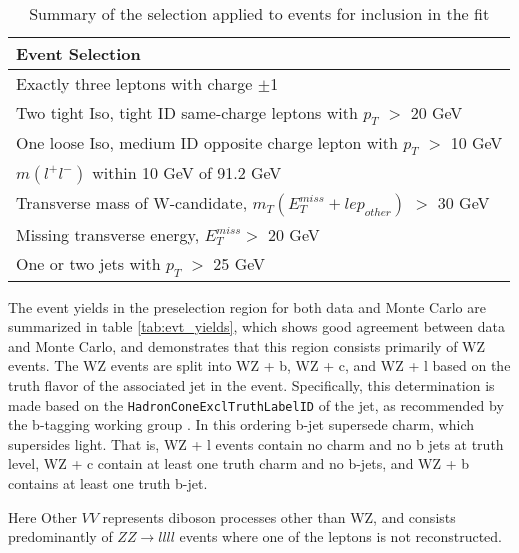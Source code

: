\begin{table}[H] 
    \centering
    \begin{tabular}{l}
        \hline\hline
        Event Selection\\
        \hline 
        Exactly three leptons with charge $\pm$1 \\
        Two tight Iso, tight ID same-charge leptons with $p_T$ $>$ 20 GeV \\
        One loose Iso, medium ID opposite charge lepton with $p_T$ $>$ 10 GeV \\
        $m(l^+l^-)$ within 10 GeV of 91.2 GeV \\
        Transverse mass of W-candidate, $m_T(E_T^{miss} + lep_{other})$ $>$ 30 GeV \\
        Missing transverse energy, $E_T^{miss} >$ 20 GeV \\
        One or two jets with $p_T$ $>$ 25 GeV \\
        \hline\hline
    \end{tabular}
    \caption{Summary of the selection applied to events for inclusion in the fit}
    \label{tbl:selection}
\end{table}

The event yields in the preselection region for both data and Monte Carlo are summarized in table \ref{tab:evt_yields}, which shows good agreement between data and Monte Carlo, and demonstrates that this region consists primarily of WZ events. The WZ events are split into WZ + b, WZ + c, and WZ + l based on the truth flavor of the associated jet in the event. Specifically, this determination is made based on the \verb!HadronConeExclTruthLabelID! of the jet, as recommended by the b-tagging working group \cite{BtagWG}. In this ordering b-jet supersede charm, which supersides light. That is, WZ + l events contain no charm and no b jets at truth level, WZ + c contain at least one truth charm and no b-jets, and WZ + b contains at least one truth b-jet. 

\begin{table}[H] 
    \centering
        
    \label{tab:evt_yields}
\end{table}

Here Other $VV$ represents diboson processes other than WZ, and consists predominantly of $ZZ\rightarrow llll$ events where one of the leptons is not reconstructed.

